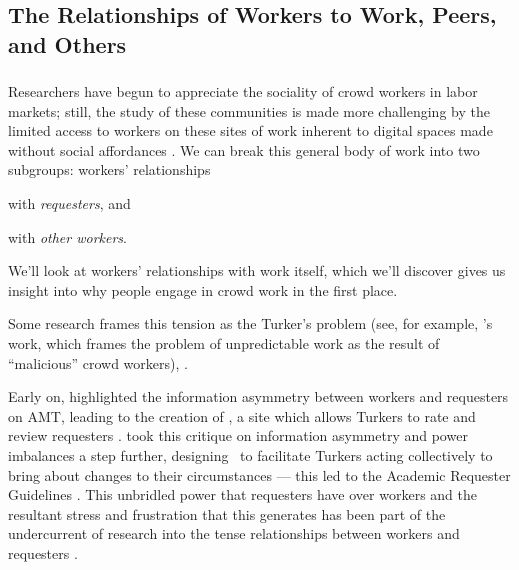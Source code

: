 \documentclass[trackingWork]{subfiles}
\begin{document}
\subsection[What will work and the place of work look like for workers]{The Relationships of Workers to Work, Peers, and Others}
\label{sec:relationships}

\subsubsection{\crowdworkpers}
Researchers have begun to appreciate
the sociality of crowd workers in labor markets;
still, the study of these communities is made more challenging by
the limited access to workers on these sites of work
inherent to digital spaces made without social affordances
\cite{crowdcollab,miller2011understanding}.
We can break this general body of work into two subgroups:
workers' relationships
\begin{inlinelist}
\item with \textit{requesters}, and
\item with \textit{other workers}.
\end{inlinelist}
We'll look at workers' relationships with work itself, which we'll discover
gives us insight into why people engage in crowd work in the first place.

Some research frames this tension as the Turker's problem
(see, for example, \citeauthor{MaliciousCrowdworkersGadiraju}'s work,
which frames the problem of unpredictable work as the result of ``malicious'' crowd workers),
\cite{MaliciousCrowdworkersGadiraju,Sheng:2008:GLI:1401890.1401965,Ipeirotis:2010:QMA:1837885.1837906}.

Early on, \citeauthor{turkopticon} highlighted
the information asymmetry between workers and requesters on AMT,
leading to the creation of \TO, a site which allows
Turkers to rate and review requesters
\cite{turkopticon}.
\citeauthor{dynamo} took this critique on information asymmetry and power imbalances a step further,
designing \DO~to facilitate
Turkers acting collectively to bring about changes to their circumstances
--- this led to the Academic Requester Guidelines
\cite{dynamo}.
This unbridled power that requesters have over workers and
the resultant stress and frustration that this generates
has been part of the undercurrent of research into
the tense relationships between workers and requesters
\cite{fixingChaos,dynamo}.
\end{document}
